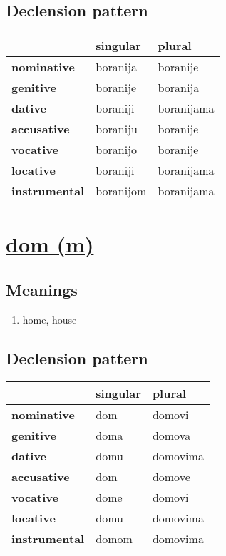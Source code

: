 \subsection*{Declension pattern}
\begin{tabularx}{\linewidth}{Xll}
\toprule
{} &   singular &      plural \\
\midrule
\textbf{nominative  } &   boranija &    boranije \\
\textbf{genitive    } &   boranije &    boranija \\
\textbf{dative      } &   boraniji &  boranijama \\
\textbf{accusative  } &   boraniju &    boranije \\
\textbf{vocative    } &   boranijo &    boranije \\
\textbf{locative    } &   boraniji &  boranijama \\
\textbf{instrumental} &  boranijom &  boranijama \\
\bottomrule
\end{tabularx}

\filbreak
\section{\underline{dom (m)}}
\subsection*{Meanings}
\begin{enumerate}
\item home, house
\end{enumerate}
\subsection*{Declension pattern}
\begin{tabularx}{\linewidth}{Xll}
\toprule
{} & singular &    plural \\
\midrule
\textbf{nominative  } &      dom &    domovi \\
\textbf{genitive    } &     doma &    domova \\
\textbf{dative      } &     domu &  domovima \\
\textbf{accusative  } &      dom &    domove \\
\textbf{vocative    } &     dome &    domovi \\
\textbf{locative    } &     domu &  domovima \\
\textbf{instrumental} &    domom &  domovima \\
\bottomrule
\end{tabularx}

